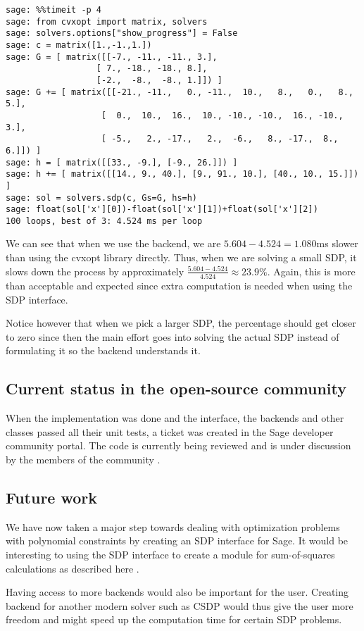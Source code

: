 \begin{verbatim}
sage: %%timeit -p 4 
sage: from cvxopt import matrix, solvers
sage: solvers.options["show_progress"] = False
sage: c = matrix([1.,-1.,1.])
sage: G = [ matrix([[-7., -11., -11., 3.],
                  [ 7., -18., -18., 8.],
                  [-2.,  -8.,  -8., 1.]]) ]
sage: G += [ matrix([[-21., -11.,   0., -11.,  10.,   8.,   0.,   8., 5.],
                   [  0.,  10.,  16.,  10., -10., -10.,  16., -10., 3.],
                   [ -5.,   2., -17.,   2.,  -6.,   8., -17.,  8., 6.]]) ]
sage: h = [ matrix([[33., -9.], [-9., 26.]]) ]
sage: h += [ matrix([[14., 9., 40.], [9., 91., 10.], [40., 10., 15.]]) ]
sage: sol = solvers.sdp(c, Gs=G, hs=h)
sage: float(sol['x'][0])-float(sol['x'][1])+float(sol['x'][2])
100 loops, best of 3: 4.524 ms per loop
\end{verbatim} 

We can see that when we use the backend, we are $5.604 - 4.524 = 1.080$ms slower than using the cvxopt library directly. Thus, when we are solving a small SDP, it slows down the process by approximately 
$\frac{5.604 - 4.524}{4.524} \approx 23.9\%$. Again, this is more than acceptable and expected since extra computation is needed when using the SDP interface. 

Notice however that when we pick a larger SDP, the percentage should get closer to zero since then the main effort goes into solving the actual SDP instead of formulating it so the backend understands it.


	\subsection{Current status in the open-source community}
When the implementation was done and the interface, the backends and other classes passed all their unit tests, a ticket was created in the Sage developer community portal. The code is currently being reviewed and is under discussion by the members of the community \cite{ticketsdp}.
	

	\subsection{Future work}
	We have now taken a major step towards dealing with optimization problems with polynomial constraints by creating an SDP interface for Sage. It would be interesting to using the SDP interface to create a module for sum-of-squares calculations as described here \cite{hol2004sum}. 

	Having access to more backends would also be important for the user. Creating backend for another modern solver such as CSDP \cite{borchers1999csdp} would thus give the user more freedom and might speed up the computation time for certain SDP problems. 
	
	
